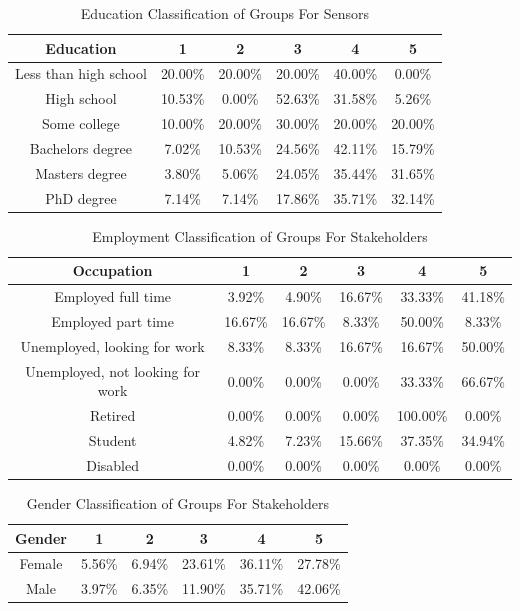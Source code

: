 \begin{table}[h!]
  \centering
  \caption{Education Classification of Groups For Sensors}
  \label{tab:edu_sensors}
  \begin{tabular}{cccccc}
    \toprule
     Education&1&2&3&4&5\\
    \midrule
    
Less than high school&20.00\%&20.00\%&20.00\%&40.00\%&0.00\%\\
High school&10.53\%&0.00\%&52.63\%&31.58\%&5.26\%\\
Some college&10.00\%&20.00\%&30.00\%&20.00\%&20.00\%\\
Bachelors degree&7.02\%&10.53\%&24.56\%&42.11\%&15.79\%\\
Masters degree&3.80\%&5.06\%&24.05\%&35.44\%&31.65\%\\
PhD degree&7.14\%&7.14\%&17.86\%&35.71\%&32.14\%\\
    \bottomrule
  \end{tabular}
\end{table} 










\begin{table}[h!]
  \centering
  \caption{Employment Classification of Groups For Stakeholders}
  \label{tab:emp_stak}
  \begin{tabular}{cccccc}
    \toprule
     Occupation&1&2&3&4&5\\
    \midrule
Employed full time	&3.92\%	&4.90\%	&16.67\%	&33.33\%	&41.18\%\\
Employed part time	&16.67\%	&16.67\%	&8.33\%	&50.00\%	&8.33\%\\
Unemployed, looking for work	&8.33\%	&8.33\%	&16.67\%	&16.67\%	&50.00\%\\
Unemployed, not looking for work	&0.00\%	&0.00\%	&0.00\%	&33.33\%	&66.67\%\\
Retired	&0.00\%	&0.00\%	&0.00\%	&100.00\%&	0.00\%\\
Student	&4.82\%	&7.23\%	&15.66\%	&37.35\%	&34.94\%\\
Disabled	&0.00\%	&0.00\%	&0.00\%	&0.00\%	&0.00\%\\
    \bottomrule
  \end{tabular}
\end{table}



\begin{table}[h!]
  \centering
  \caption{Gender Classification of Groups For Stakeholders}
  \label{tab:gender_stak}
  \begin{tabular}{cccccc}
    \toprule
     Gender&1&2&3&4&5 \\
     \midrule
Female&5.56\%&6.94\%&23.61\%&36.11\%&27.78\% \\
Male&3.97\%&6.35\%&11.90\%&35.71\%&42.06\%\\
    \bottomrule
  \end{tabular}
\end{table}



